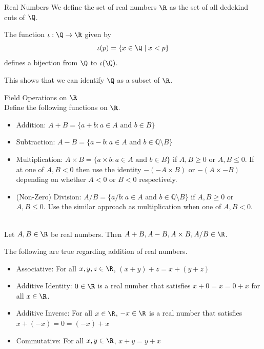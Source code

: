 \documentclass[a4paper]{article}
\begin{document}
\begin{defn}{Real Numbers}{} We define the set of real numbers $\R$ as the set of all dedekind cuts of $\Q$. 
\end{defn}

\begin{prp}{}{} The function $\iota:\Q\to\R$ given by $$\iota(p)=\{x\in\Q\;|\;x<p\}$$ defines a bijection from $\Q$ to $\iota(\Q)$. 
\end{prp}

This shows that we can identify $\Q$ as a subset of $\R$. 

\begin{defn}{Field Operations on $\R$}{}\\
Define the following functions on $\R$. 
\begin{itemize}
\item Addition: $A+B=\{a+b:a\in A\text{ and }b\in B\}$
\item Subtraction: $A-B=\{a-b:a\in A\text{ and }b\in \mathbb{Q}\setminus B\}$
\item Multiplication: $A\times B=\{a\times b:a\in A\text{ and }b\in B\}$ if $A,B\geq 0$ or $A,B\leq 0$. If at one of $A,B<0$ then use the identity $-(-A\times B)$ or $-(A\times -B)$ depending on whether $A<0$ or $B<0$ respectively. 
\item (Non-Zero) Division: $A/B=\{a/b:a\in A\text{ and }b\in \mathbb{Q}\setminus B\}$ if $A,B\geq 0$ or $A,B\leq 0$. Use the similar approach as multiplication when one of $A,B<0$. 
\end{itemize}
\end{defn}

\begin{lmm}{}{}\\
Let $A,B\in\R$ be real numbers. Then $A+B,A-B,A\times B,A/B\in\R$. 
\end{lmm}

\begin{prp}{}{} The following are true regarding addition of real numbers. 
\begin{itemize}
\item Associative: For all $x,y,z\in\R$, $(x+y)+z=x+(y+z)$
\item Additive Identity: $0\in\R$ is a real number that satisfies $x+0=x=0+x$ for all $x\in\R$. 
\item Additive Inverse: For all $x\in\R$, $-x\in\R$ is a real number that satisfies $x+(-x)=0=(-x)+x$
\item Commutative: For all $x,y\in\R$, $x+y=y+x$
\end{itemize}
\end{prp}
\end{document}
